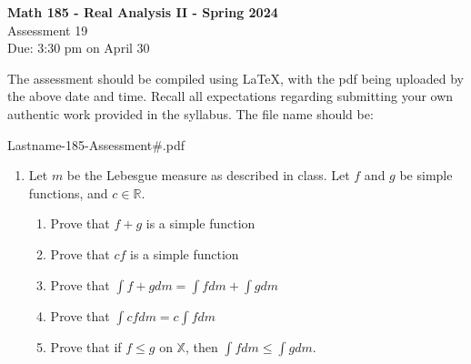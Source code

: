 \documentclass[12pt]{article}
\theoremstyle{plain}
\theoremstyle{definition}
\theoremstyle{remark}
\begin{document}
\begin{center}
{\large\textbf{Math 185 - Real Analysis II - Spring 2024}}\ \\
\medskip
Assessment 19\\Due: 3:30 pm on April 30
\smallskip
\end{center}

\vspace{.15 in}

\noindent{}The assessment should be compiled using LaTeX, with the pdf being uploaded by the above date and time.  Recall all expectations regarding submitting your own authentic work provided in the syllabus.  The file name should be:

\begin{center}Lastname-185-Assessment\#.pdf\end{center}


\vspace{.5in}

\begin{enumerate}
\item Let $m$ be the Lebesgue measure as described in class.  Let $f$ and $g$ be simple functions, and $c\in\mathbb{R}$.
\begin{enumerate}
\item Prove that $f+g$ is a simple function
\item Prove that $cf$ is a simple function
\item Prove that $\int f+g dm=\int fdm+\int gdm$
\item Prove that $\int cfdm=c\int fdm$
\item Prove that if $f\leq g$ on $\mathbb{X}$, then $\int fdm\leq\int gdm$.
\end{enumerate}
\end{enumerate}



\end{document}
